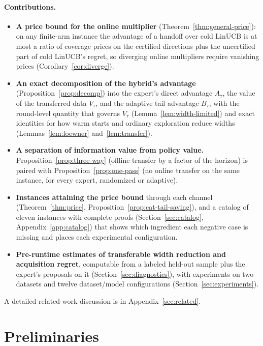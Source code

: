 \documentclass{article}
\theoremstyle{definition}
\theoremstyle{remark}
\theoremstyle{remark}
\begin{document}
\paragraph{Contributions.}
\begin{itemize}[itemsep=1pt, topsep=1pt, leftmargin=*]
\item \textbf{A price bound for the online multiplier}
(Theorem~\ref{thm:general-price}): on any finite-arm instance the advantage
of a handoff over cold LinUCB is at most a ratio of coverage prices on the
certified directions plus the uncertified part of cold LinUCB's regret, so
diverging online multipliers require vanishing prices
(Corollary~\ref{cor:diverge}).
\item \textbf{An exact decomposition of the hybrid's advantage}
(Proposition~\ref{prop:decomp}) into the expert's direct advantage $A_\tau$,
the value of the transferred data $V_\tau$, and the adaptive tail advantage
$B_\tau$, with the round-level quantity that governs $V_\tau$
(Lemma~\ref{lem:width-limited}) and exact identities for how warm starts and
ordinary exploration reduce widths (Lemmas~\ref{lem:loewner}
and~\ref{lem:transfer}).
\item \textbf{A separation of information value from policy value.}
Proposition~\ref{prop:three-way} (offline transfer by a factor of the
horizon) is paired with Proposition~\ref{prop:one-pass} (no online transfer
on the same instance, for every expert, randomized or adaptive).
\item \textbf{Instances attaining the price bound} through each channel
(Theorem~\ref{thm:price}, Proposition~\ref{prop:cat-tail-saving}), and a
catalog of eleven instances with complete proofs (Section~\ref{sec:catalog},
Appendix~\ref{app:catalog}) that shows which ingredient each negative case is
missing and places each experimental configuration.
\item \textbf{Pre-runtime estimates of transferable width reduction and
acquisition regret}, computable from a labeled held-out sample plus the
expert's proposals on it (Section~\ref{sec:diagnostics}), with experiments on
two datasets and twelve dataset/model configurations
(Section~\ref{sec:experiments}).
\end{itemize}
A detailed related-work discussion is in Appendix~\ref{sec:related}.


\section{Preliminaries}
\label{sec:preliminaries}
\end{document}

